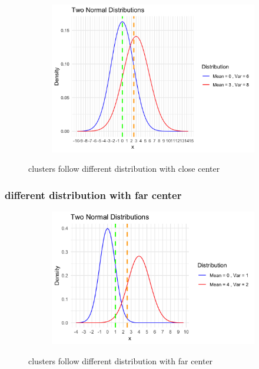 \documentclass{article}
\begin{document}
\begin{figure}[h]
  \centering
  \begin{subfigure}{0.8\textwidth}
      \centering
      \includegraphics[width=\textwidth]{images/dist_simu/1-0_6-3_8.png}
  \end{subfigure}
  \caption{clusters follow different distribution with close center}
  \label{fig:close_dist}
\end{figure}

\subsubsection*{different distribution with far center}

\begin{figure}[h]
  \centering
  \begin{subfigure}{0.8\textwidth}
      \centering
      \includegraphics[width=\textwidth]{images/dist_simu/2-0_1-4_2.png}
  \end{subfigure}
  \caption{clusters follow different distribution with far center}
  \label{fig:far_dist}
\end{figure}
\end{document}
